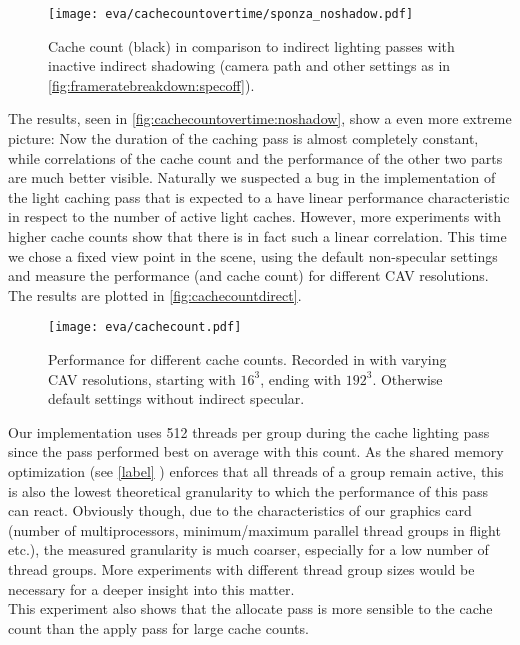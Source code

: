 \documentclass[thesis.tex]{subfiles}
\begin{document}
\begin{figure}
\centering
\texttt{[image: eva/cachecountovertime/sponza\_noshadow.pdf]}
\caption{Cache count (black) in comparison to indirect lighting passes with inactive indirect shadowing (camera path and other settings as in \autoref{fig:frameratebreakdown:specoff}).}
\label{fig:cachecountovertime:noshadow}
\end{figure}

The results, seen in \autoref{fig:cachecountovertime:noshadow}, show a even more extreme picture:
Now the duration of the caching pass is almost completely constant, while correlations of the cache count and the performance of the other two parts are much better visible.
Naturally we suspected a bug in the implementation of the light caching pass that is expected to a have linear performance characteristic in respect to the number of active light caches.
However, more experiments with higher cache counts show that there is in fact such a linear correlation.
This time we chose a fixed view point in the  scene, using the default non-specular settings and measure the performance (and cache count) for different CAV resolutions.
The results are plotted in \autoref{fig:cachecountdirect}.
\begin{figure}
\centering
\texttt{[image: eva/cachecount.pdf]}
\caption{Performance for different cache counts. Recorded in  with varying CAV resolutions, starting with $16^3$, ending with $192^3$. Otherwise default settings without indirect specular. }
\label{fig:cachecountdirect}
\end{figure}
Our implementation uses 512 threads per group during the cache lighting pass since the pass performed best on average with this count.
As the shared memory optimization (see \autoref{label} \todo{}) enforces that all threads of a group remain active, this is also the lowest theoretical granularity to which the performance of this pass can react.
Obviously though, due to the characteristics of our graphics card (number of multiprocessors, minimum/maximum parallel thread groups in flight etc.), the measured granularity is much coarser, especially for a low number of thread groups.
More experiments with different thread group sizes would be necessary for a deeper insight into this matter.
\\
This experiment also shows that the allocate pass is more sensible to the cache count than the apply pass for large cache counts.
\end{document}
